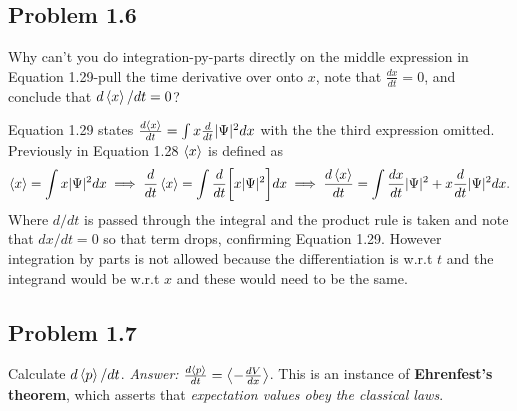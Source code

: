 \documentclass[12pt]{exam}
\begin{document}
\subsection*{Problem 1.6}
Why can't you do integration-py-parts directly on the middle expression in Equation 1.29-pull the time derivative over onto $x$, note that $\frac{dx}{dt}=0$, and conclude that $d\expval{x}/dt=0$?

\begin{solution}
    Equation 1.29 states $\frac{d\expval{x}}{dt} = \int x\frac{d}{dt}|\Psi|^2dx$ with the the third expression omitted. Previously in Equation 1.28 $\expval{x}$ is defined as 
    $$ \expval{x}  = \int x|\Psi|^2dx \implies \frac{d}{dt}\expval{x} = \int \frac{d}{dt}\bigg[x|\Psi|^2\bigg]dx \implies \frac{d\expval{x}}{dt} = \int \frac{dx}{dt}|\Psi|^2 + x\frac{d}{dt}|\Psi|^2dx.$$
    Where $d/dt$ is passed through the integral and the product rule is taken and note that $dx/dt = 0$ so that term drops, confirming Equation 1.29. However integration by parts is not allowed because the differentiation is w.r.t $t$ and the integrand would be w.r.t $x$ and these would need to be the same.
\end{solution}



\subsection*{Problem 1.7}
Calculate $d\expval{p}/dt$. \textit{Answer:} $\frac{d\expval{p}}{dt} = \expval{-\frac{dV}{dx}}$. This is an instance of \textbf{Ehrenfest's theorem}, which asserts that \textit{expectation values obey the classical laws}. 
\end{document}
